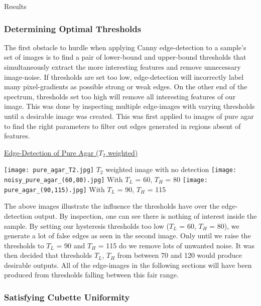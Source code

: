 \documentclass[a4paper,12pt]{article}
\begin{document}
\begin{section}{Results}
\subsubsection{Determining Optimal Thresholds} %

The first obstacle to hurdle when applying Canny edge-detection to a sample's set of images is to find a pair of lower-bound and upper-bound thresholds that simultaneously extract the more interesting features and remove unnecessary image-noise.  If thresholds are set too low, edge-detection will incorrectly label many pixel-gradients as possible strong or weak edges. On the other end of the spectrum, thresholds set too high will remove all interesting features of our image. This was done by inspecting multiple edge-images with varying thresholds until a desirable image was created. This was first applied to images of pure agar to find the right parameters to filter out edges generated in regions absent of features.

\begin{center} \underline{Edge-Detection of Pure Agar ($T_2$ weighted)} \end{center}
\begin{flushleft}
\texttt{[image: pure\_agar\_T2.jpg]}				\hspace{2cm}$T_2$ weighted image with no detection
\texttt{[image: noisy\_pure\_agar\_(60,80).jpg]}	\hspace{2cm}With $T_L$ = 60, $T_H$ = 80
\texttt{[image: pure\_agar\_(90,115).jpg]}			\hspace{2cm}With $T_L$ = 90, $T_H$ = 115
\end{flushleft}

The above images illustrate the influence the thresholds have over the edge-detection output. By inspection, one can see there is nothing of interest inside the sample. By setting our hysteresis thresholds too low ($T_L$ = 60, $T_H$ = 80), we generate a lot of false edges as seen in the second image. Only until we raise the thresholds to $T_L$ = 90 and $T_H$ = 115 do we remove lots of unwanted noise. It was then decided that thresholds $T_L$, $T_H$ from between 70 and 120 would produce desirable outputs. All of the edge-images in the following sections will have been produced from thresholds falling between this fair range.

\subsubsection{Satisfying Cubette Uniformity}


\end{section}
\end{document}
